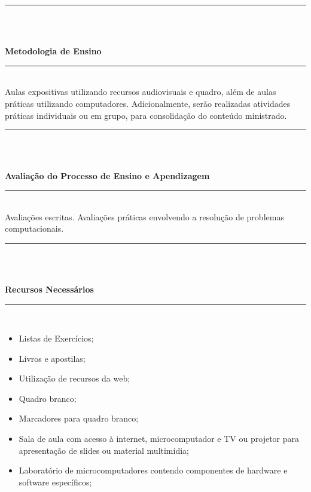 \noindent\rule{16.5cm}{0.4pt}\\
\\
\vspace{-12mm}
\begin{center}\textbf{Metodologia de Ensino}\end{center} 
\vspace{-5mm}
\noindent\rule{16.5cm}{0.4pt}
\\
   Aulas expositivas utilizando recursos audiovisuais e quadro, além de aulas práticas utilizando computadores. Adicionalmente, serão realizadas atividades práticas individuais ou em grupo, para consolidação do conteúdo ministrado.\\
\noindent\rule{16.5cm}{0.4pt}\\
\\
\vspace{-12mm}
\begin{center}\textbf{Avaliação do Processo de Ensino e Apendizagem}\end{center}
\vspace{-5mm}
\noindent\rule{16.5cm}{0.4pt}
\\
   Avaliações escritas. Avalia\c{c}\~oes pr\'aticas envolvendo a resolu\c{c}\~ao de problemas computacionais.\\
\noindent\rule{16.5cm}{0.4pt}\\
\\
\vspace{-12mm}
\begin{center}\textbf{Recursos Necessários}\end{center}
\vspace{-5mm}
\noindent\rule{16.5cm}{0.4pt}
\\
\begin{itemize} 
  \item Listas de Exercícios;
  \item Livros e apostilas;
  \item Utilização de recursos da web;
  \item Quadro branco;
  \item Marcadores para quadro branco;
  \item Sala de aula com acesso à internet, microcomputador e TV ou projetor para apresentação de slides ou material multimídia;
  \item Laboratório de microcomputadores contendo componentes de hardware e software específicos;
\end{itemize}
